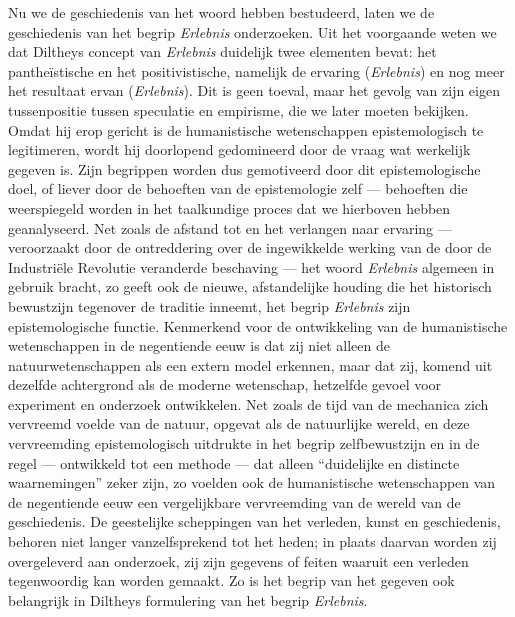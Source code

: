 Nu we de geschiedenis van het woord hebben bestudeerd, laten we de geschiedenis van het begrip \textit{Erlebnis} onderzoeken. Uit het voorgaande weten we dat Diltheys concept van \textit{Erlebnis} duidelijk twee elementen bevat: het pantheïstische en het positivistische, namelijk de ervaring (\textit{Erlebnis}) en nog meer het resultaat ervan (\textit{Erlebnis}). Dit is geen toeval, maar het gevolg van zijn eigen tussenpositie tussen speculatie en empirisme, die we later moeten bekijken. Omdat hij erop gericht is de humanistische wetenschappen epistemologisch te legitimeren, wordt hij doorlopend gedomineerd door de vraag wat werkelijk gegeven is. Zijn begrippen worden dus gemotiveerd door dit epistemologische doel, of liever door de behoeften van de epistemologie zelf — behoeften die weerspiegeld worden in het taalkundige proces dat we hierboven hebben geanalyseerd.
Net zoals de afstand tot en het verlangen naar ervaring — veroorzaakt door de ontreddering over de ingewikkelde werking van de door de Industriële Revolutie veranderde beschaving — het woord \textit{Erlebnis} algemeen in gebruik bracht, zo geeft ook de nieuwe, afstandelijke houding die het historisch bewustzijn tegenover de traditie inneemt, het begrip \textit{Erlebnis} zijn epistemologische functie. Kenmerkend voor de ontwikkeling van de humanistische wetenschappen in de negentiende eeuw is dat zij niet alleen de natuurwetenschappen als een extern model erkennen, maar dat zij, komend uit dezelfde achtergrond als de moderne wetenschap, hetzelfde gevoel voor experiment en onderzoek ontwikkelen. Net zoals de tijd van de mechanica zich vervreemd voelde van de natuur, opgevat als de natuurlijke wereld, en deze vervreemding epistemologisch uitdrukte in het begrip zelfbewustzijn en in de regel — ontwikkeld tot een methode — dat alleen ``duidelijke en distincte waarnemingen'' zeker zijn, zo voelden ook de humanistische wetenschappen van de negentiende eeuw een vergelijkbare vervreemding van de wereld van de geschiedenis. De geestelijke scheppingen van het verleden, kunst en geschiedenis, behoren niet langer vanzelfsprekend tot het heden; in plaats daarvan worden zij overgeleverd aan onderzoek, zij zijn gegevens of feiten waaruit een verleden tegenwoordig kan worden gemaakt. Zo is het begrip van het gegeven ook belangrijk in Diltheys formulering van het begrip \textit{Erlebnis}.

